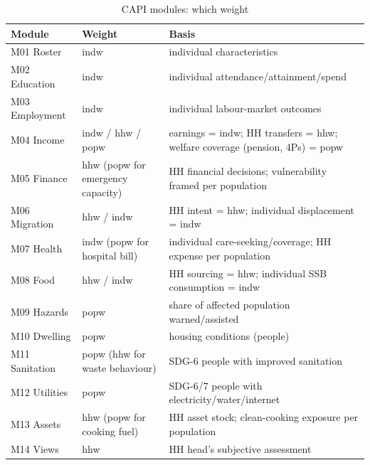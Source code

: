 \documentclass[AEJ]{AEA}
\begin{document}
\begin{table}[!t]
\raggedright
\begin{threeparttable}
\caption{CAPI modules: which weight}
\label{tab:usecapi}
\footnotesize
\begin{tabularx}{\textwidth}{@{}Y{0.7} Y{0.7} Y{1.6}@{}}
\toprule
Module & Weight & Basis \\
\midrule
M01 Roster & indw & individual characteristics \\
M02 Education & indw & individual attendance/attainment/spend \\
M03 Employment & indw & individual labour-market outcomes \\
M04 Income & indw / hhw / popw & earnings = indw; HH transfers = hhw; welfare coverage (pension, 4Ps) = popw \\
M05 Finance & hhw (popw for emergency capacity) & HH financial decisions; vulnerability framed per population \\
M06 Migration & hhw / indw & HH intent = hhw; individual displacement = indw \\
M07 Health & indw (popw for hospital bill) & individual care-seeking/coverage; HH expense per population \\
M08 Food & hhw / indw & HH sourcing = hhw; individual SSB consumption = indw \\
M09 Hazards & popw & share of affected population warned/assisted \\
M10 Dwelling & popw & housing conditions (people) \\
M11 Sanitation & popw (hhw for waste behaviour) & SDG-6 people with improved sanitation \\
M12 Utilities & popw & SDG-6/7 people with electricity/water/internet \\
M13 Assets & hhw (popw for cooking fuel) & HH asset stock; clean-cooking exposure per population \\
M14 Views & hhw & HH head's subjective assessment \\
\bottomrule
\end{tabularx}
\end{threeparttable}
\end{table}
\end{document}
